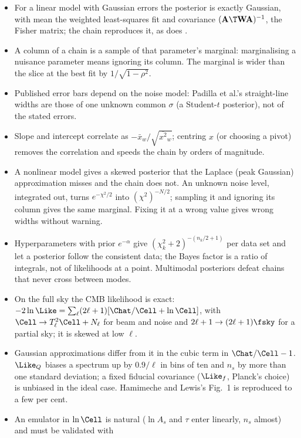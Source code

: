 \begin{recap}
\begin{itemize}[itemsep=1pt,leftmargin=1.2em]
  \item For a linear model with Gaussian errors the posterior is exactly Gaussian, with mean the weighted least-squares fit
        and covariance $(\mathbf A\T\mathbf W\mathbf A)^{-1}$, the Fisher matrix; the chain reproduces it, as does .
  \item A column of a chain is a sample of that parameter's marginal: marginalising a nuisance parameter means ignoring
        its column. The marginal is wider than the slice at the best fit by $1/\sqrt{1-\rho^2}$.
  \item Published error bars depend on the noise model: Padilla et al.'s straight-line widths are those of one unknown
        common $\sigma$ (a Student-$t$ posterior), not of the stated errors.
  \item Slope and intercept correlate as $-\bar x_w/\sqrt{\overline{x^2}_w}$; centring $x$ (or choosing a pivot) removes the
        correlation and speeds the chain by orders of magnitude.
  \item A nonlinear model gives a skewed posterior that the Laplace (peak Gaussian) approximation misses and the chain
        does not. An unknown noise level, integrated out, turns $e^{-\chi^2/2}$ into $(\chi^2)^{-N/2}$; sampling it and ignoring
        its column gives the same marginal. Fixing it at a wrong value gives wrong widths without warning.
  \item Hyperparameters with prior $e^{-\alpha}$ give $(\chi^2_k+2)^{-(n_k/2+1)}$ per data set and let a posterior follow the
        consistent data; the Bayes factor is a ratio of integrals, not of likelihoods at a point. Multimodal posteriors
        defeat chains that never cross between modes.
  \item On the full sky the CMB likelihood is exact: $-2\ln\Like=\sum_\ell(2\ell+1)[\Chat/\Cell+\ln\Cell]$, with $\Cell\to T^2_\ell\Cell+N_\ell$
        for beam and noise and $2\ell+1\to(2\ell+1)\fsky$ for a partial sky; it is skewed at low $\ell$.
  \item Gaussian approximations differ from it in the cubic term in $\Chat/\Cell-1$. $\Like_Q$ biases a spectrum up by
        $0.9/\ell$ in bins of ten and $n_s$ by more than one standard deviation; a fixed fiducial covariance ($\Like_f$, Planck's
        choice) is unbiased in the ideal case. Hamimeche and Lewis's Fig.~1 is reproduced to a few per cent.
  \item An emulator in $\ln\Cell$ is natural ($\ln A_s$ and $\tau$ enter linearly, $n_s$ almost) and must be validated with

\end{itemize}
\end{recap}
